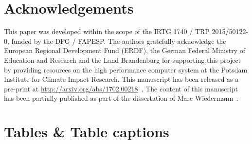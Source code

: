 \documentclass[utf8]{frontiersSCNS} %
\begin{document}
\section*{Acknowledgements}
This paper was developed within the scope of the IRTG 1740 / TRP 2015/50122-0, funded by the DFG / FAPESP. The authors gratefully acknowledge the European Regional Development Fund (ERDF), the German Federal Ministry of Education and Research and the Land Brandenburg for supporting this project by providing resources on the high performance computer system at the Potsdam Institute for Climate Impact Research. This manuscript has been released as a pre-print at \url{http://arxiv.org/abs/1702.00218}~\citep{wiedermann2020differential}. The content of this manuscript has been partially published as part of the  dissertation of Marc Wiedermann~\citep{wiedermann2018classification}.





\newpage

\section*{Tables \& Table captions}
\end{document}
